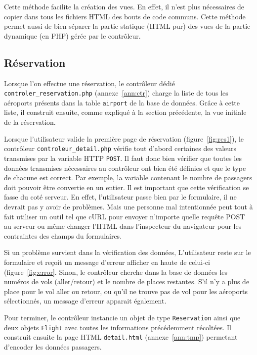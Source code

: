 \documentclass[12pt,a4paper]{article}
\begin{document}
		Cette méthode facilite la création des vues. En effet, il n'est plus nécessaires de copier dans tous les fichiers HTML des bouts de code communs. Cette méthode permet aussi de bien séparer la partie statique (HTML pur) des vues de la partie dynamique (en PHP) gérée par le contrôleur.

		\subsection{Réservation}
      Lorsque l'on effectue une réservation, le contrôleur dédié \texttt{controler\_reservation.php} (annexe~\ref{ann:ctr}) charge la liste de tous les aéroports présents dans la table \texttt{airport} de la base de données. Grâce à cette liste, il construit ensuite, comme expliqué à la section précédente, la vue initiale de la réservation.

			Lorsque l'utilisateur valide la première page de réservation (figure~\ref{fig:res1}), le contrôleur \linebreak[4] \texttt{controleur\_detail.php} vérifie tout d'abord certaines des valeurs transmises par la variable HTTP \texttt{POST}. Il faut donc bien vérifier que toutes les données transmises nécessaires au contrôleur ont bien été définies et que le type de chacune est correct. Par exemple, la variable contenant le nombre de passagers doit pouvoir être convertie en un entier. Il est important que cette vérification se fasse du coté serveur. En effet, l'utilisateur passe bien par le formulaire, il ne devrait pas y avoir de problèmes. Mais une personne mal intentionnée peut tout à fait utiliser un outil tel que cURL pour envoyer n'importe quelle requête POST au serveur ou même changer l'HTML dans l'inspecteur du navigateur pour les contraintes des champs du formulaires.

      Si un problème survient dans la vérification des données, L'utilisateur reste sur le formulaire et reçoit un message d'erreur afficher en haute de celui-ci (figure~\ref{fig:error}. Sinon, le contrôleur cherche dans la base de données les numéros de vols (aller/retour) et le nombre de places restantes. S'il n'y a plus de place pour le vol aller ou retour, ou qu'il ne trouve pas de vol pour les aéroports sélectionnés,  un message d'erreur apparait également.


      Pour terminer, le contrôleur instancie un objet de type \texttt{Reservation} ainsi que deux objets \texttt{Flight} avec toutes les informations précédemment récoltées. Il construit ensuite la page HTML \texttt{detail.html} (annexe~\ref{ann:tmp}) permetant d'encoder les données passagers.
\end{document}
